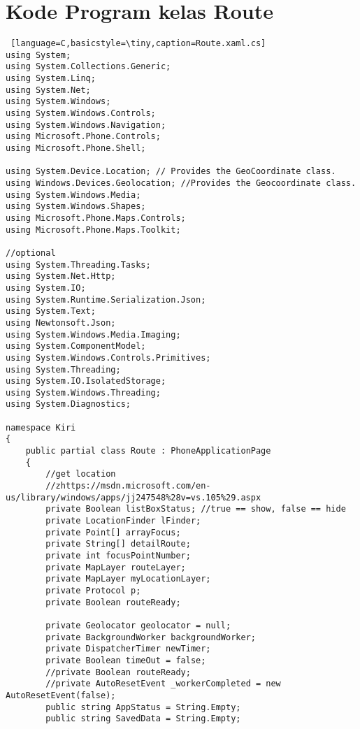 \chapter{Kode Program kelas Route}
\label{app:C}

\singlespacing 
%
%

\begin{lstlisting} [language=C,basicstyle=\tiny,caption=Route.xaml.cs]
using System;
using System.Collections.Generic;
using System.Linq;
using System.Net;
using System.Windows;
using System.Windows.Controls;
using System.Windows.Navigation;
using Microsoft.Phone.Controls;
using Microsoft.Phone.Shell;

using System.Device.Location; // Provides the GeoCoordinate class.
using Windows.Devices.Geolocation; //Provides the Geocoordinate class.
using System.Windows.Media;
using System.Windows.Shapes;
using Microsoft.Phone.Maps.Controls;
using Microsoft.Phone.Maps.Toolkit;

//optional
using System.Threading.Tasks;
using System.Net.Http;
using System.IO;
using System.Runtime.Serialization.Json;
using System.Text;
using Newtonsoft.Json;
using System.Windows.Media.Imaging;
using System.ComponentModel;
using System.Windows.Controls.Primitives;
using System.Threading;
using System.IO.IsolatedStorage;
using System.Windows.Threading;
using System.Diagnostics;

namespace Kiri
{
    public partial class Route : PhoneApplicationPage
    {
        //get location
        //zhttps://msdn.microsoft.com/en-us/library/windows/apps/jj247548%28v=vs.105%29.aspx
        private Boolean listBoxStatus; //true == show, false == hide
        private LocationFinder lFinder;
        private Point[] arrayFocus;
        private String[] detailRoute;
        private int focusPointNumber;
        private MapLayer routeLayer;
        private MapLayer myLocationLayer;
        private Protocol p;
        private Boolean routeReady;

        private Geolocator geolocator = null;
        private BackgroundWorker backgroundWorker;
        private DispatcherTimer newTimer;
        private Boolean timeOut = false;
        //private Boolean routeReady;
        //private AutoResetEvent _workerCompleted = new AutoResetEvent(false);
        public string AppStatus = String.Empty;
        public string SavedData = String.Empty;


\end{lstlisting}
